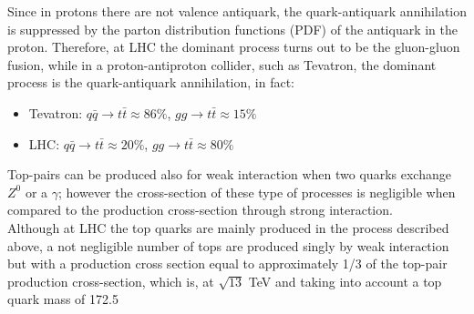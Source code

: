Since in protons there are not valence antiquark, the quark-antiquark annihilation is suppressed by 
the parton distribution functions (PDF) of the antiquark in the proton. Therefore, at LHC the dominant process turns out to be the
gluon-gluon fusion, while in a proton-antiproton collider, such as Tevatron,
the dominant process is the quark-antiquark annihilation, in fact:
\begin{itemize}
	\item Tevatron: $q\bar{q}\rightarrow t\bar{t} \approx 86\%$, $gg\rightarrow t\bar{t} \approx 15\%$
	\item LHC: $q\bar{q}\rightarrow t\bar{t} \approx 20\%$, $gg\rightarrow t\bar{t} \approx 80\%$
\end{itemize}
Top-pairs can be produced also for weak interaction when two quarks exchange $Z^0$ or a $\gamma$; however the cross-section of these
type of processes is negligible when compared to the production cross-section through strong interaction.\\
Although at LHC the top quarks are mainly produced in the process described above, a not negligible number of tops 
are produced singly by weak interaction but with a production cross section equal to approximately 1/3 of the top-pair production
cross-section, which is, at $\sqrt{13}$ TeV and taking into account a top quark mass of 172.5 \\

